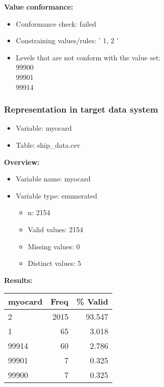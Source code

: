 \documentclass[
]{article}
\providecommand{\tightlist}{%
  \setlength{\itemsep}{0pt}\setlength{\parskip}{0pt}}
\begin{document}
\textbf{Value conformance:}

\begin{itemize}
\tightlist
\item
  Conformance check: failed
\item
  Constraining values/rules: ' 1, 2 '
\item
  Levels that are not conform with the value set:\\
  99900\\
  99901\\
  99914
\end{itemize}

\newpage

\hypertarget{representation-in-target-data-system-17}{%
\subsubsection{\texorpdfstring{Representation in \textbf{target} data
system}{Representation in target data system}}\label{representation-in-target-data-system-17}}

\begin{itemize}
\tightlist
\item
  Variable: myocard
\item
  Table: ship\_data.csv
\end{itemize}

\textbf{Overview:}

\begin{itemize}
\tightlist
\item
  Variable name: myocard
\item
  Variable type: enumerated

  \begin{itemize}
  \tightlist
  \item
    n: 2154
  \item
    Valid values: 2154
  \item
    Missing values: 0
  \item
    Distinct values: 5
  \end{itemize}
\end{itemize}

\textbf{Results:}\\

\begin{table}[H]
\centering
\begin{tabular}{l|r|r}
\hline
\textbf{myocard} & \textbf{Freq} & \textbf{\% Valid}\\
\hline
2 & 2015 & 93.547\\
\hline
1 & 65 & 3.018\\
\hline
99914 & 60 & 2.786\\
\hline
99901 & 7 & 0.325\\
\hline
99900 & 7 & 0.325\\
\hline
\end{tabular}
\end{table}
\end{document}
